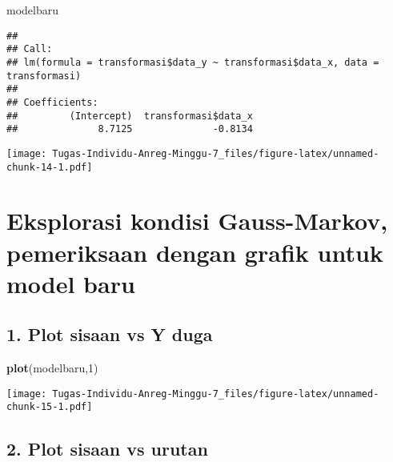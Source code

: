 \documentclass[
]{article}
\newenvironment{Shaded}{\begin{snugshade}}{\end{snugshade}}
\newcommand{\DecValTok}[1]{\textcolor[rgb]{0.00,0.00,0.81}{#1}}
\newcommand{\FunctionTok}[1]{\textcolor[rgb]{0.13,0.29,0.53}{\textbf{#1}}}
\newcommand{\NormalTok}[1]{#1}
\newcommand{\SpecialCharTok}[1]{\textcolor[rgb]{0.81,0.36,0.00}{\textbf{#1}}}
\begin{document}
\begin{Shaded}
\begin{Highlighting}[]
\NormalTok{modelbaru}
\end{Highlighting}
\end{Shaded}

\begin{verbatim}
## 
## Call:
## lm(formula = transformasi$data_y ~ transformasi$data_x, data = transformasi)
## 
## Coefficients:
##         (Intercept)  transformasi$data_x  
##              8.7125              -0.8134
\end{verbatim}

\begin{Shaded}
\end{Shaded}

\texttt{[image: Tugas-Individu-Anreg-Minggu-7\_files/figure-latex/unnamed-chunk-14-1.pdf]}

\hypertarget{eksplorasi-kondisi-gauss-markov-pemeriksaan-dengan-grafik-untuk-model-baru}{%
\section{Eksplorasi kondisi Gauss-Markov, pemeriksaan dengan grafik
untuk model
baru}\label{eksplorasi-kondisi-gauss-markov-pemeriksaan-dengan-grafik-untuk-model-baru}}

\hypertarget{plot-sisaan-vs-y-duga-1}{%
\subsection{1. Plot sisaan vs Y duga}\label{plot-sisaan-vs-y-duga-1}}

\begin{Shaded}
\begin{Highlighting}[]
\FunctionTok{plot}\NormalTok{(modelbaru,}\DecValTok{1}\NormalTok{)}
\end{Highlighting}
\end{Shaded}

\texttt{[image: Tugas-Individu-Anreg-Minggu-7\_files/figure-latex/unnamed-chunk-15-1.pdf]}

\hypertarget{plot-sisaan-vs-urutan-1}{%
\subsection{2. Plot sisaan vs urutan}\label{plot-sisaan-vs-urutan-1}}
\end{document}
